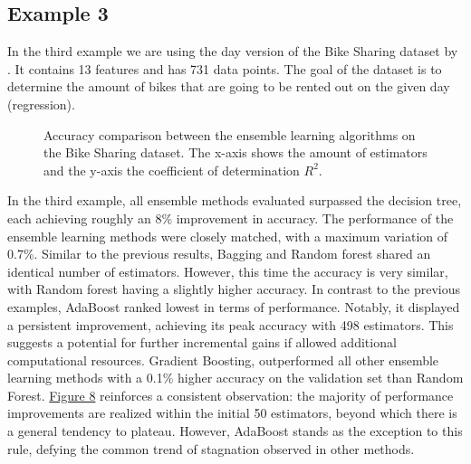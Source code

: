 \subsection{Example 3}
\label{sec:example3}

In the third example we are using the day version of the Bike Sharing dataset by
\citet*{bike_sharing}. It contains 13 features and has 731 data 
points. The goal of the dataset is to determine the amount of bikes that are going
to be rented out on the given day (regression).



\begin{figure}[htbp]
    \centering
    \label{fig:bs_comparison}
    \caption{
        Accuracy comparison between the ensemble learning algorithms on the Bike Sharing dataset.
        The x-axis shows the amount of estimators and the y-axis the coefficient of determination $R^2$.
    }
\end{figure}

In the third example, all ensemble methods evaluated surpassed the decision tree, each achieving roughly an 8\% improvement in accuracy.
The performance of the ensemble learning methods were closely matched, with a maximum variation of 0.7\%.
Similar to the previous results, Bagging and Random forest shared an identical number of estimators. However, this time the 
accuracy is very similar, with Random forest having a slightly higher accuracy.
In contrast to the previous examples, AdaBoost ranked lowest in terms of performance. Notably, it displayed a persistent
improvement, achieving its peak accuracy with 498 estimators. This suggests a potential for further incremental gains if allowed
additional computational resources.
Gradient Boosting, outperformed all other ensemble learning methods with a 0.1\% higher accuracy on the validation set than Random
Forest.
\hyperref[fig:bs_comparison]{Figure 8} reinforces a consistent observation: the majority of performance improvements are realized
within the initial 50 estimators, beyond which there is a general tendency to plateau.
However, AdaBoost stands as the exception to this rule, defying the common trend of stagnation observed in other methods.


